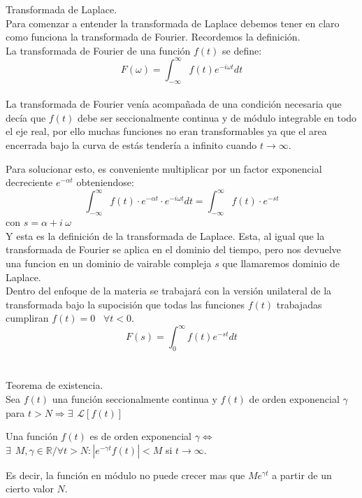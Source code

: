 \documentclass[]{article}
\begin{document}
\huge Transformada de Laplace.
\\

\normalsize Para comenzar a entender la transformada de Laplace debemos tener en claro como funciona la transformada de Fourier. Recordemos la definición.
\\
La transformada de Fourier de una función $f(t)$ se define:
$$
F(\omega) = \int_{-\infty}^{\infty}f(t)e^{-i\omega t} dt 
$$
\\
La transformada de Fourier venía acompañada de una condición necesaria que decía que $f(t)$ debe ser seccionalmente continua y de módulo integrable en todo el eje real, por ello muchas funciones no eran transformables ya que el area encerrada bajo la curva de estás tendería a infinito cuando $t\rightarrow \infty$.

Para solucionar esto, es conveniente multiplicar por un factor exponencial decreciente $e^{-\alpha t }$ obteniendose:
$$
\int_{-\infty}^{\infty} f(t) \cdot  e^{-\alpha t}\cdot  e^{-i\omega t}dt =
\int_{-\infty}^{\infty} f(t) \cdot  e^{-st}
$$
con $s=\alpha + i \hspace{3pt} \omega $
\\ Y esta es la definición de la transformada de Laplace. Esta, al igual que la transformada de Fourier se aplica en el dominio del tiempo, pero nos devuelve una funcion en un dominio de vairable compleja $s$ que llamaremos dominio de Laplace.
\\ Dentro del enfoque de la materia se trabajará con la versión unilateral de la transformada bajo la supocisión que todas las funciones $f(t)$ trabajadas cumpliran 
$f(t) = 0  \hspace{10pt} \forall t < 0$.
$$
F(s) = \int_{0}^{\infty} f(t) e^{-st} dt
$$
\\
\\
\Large Teorema de existencia.
\\

\normalsize Sea $f(t)$ una función seccionalmente continua y $f(t)$ de orden exponencial $\gamma$ para $t > N \Rightarrow \exists \hspace{5pt} \mathscr{L}[f(t)]$

Una función $f(t)$ es de orden exponencial $\gamma \Longleftrightarrow$ ${\exists \hspace{5pt} M,\gamma \in \mathbb{R}  / \forall t > N: |e^{-\gamma t} f(t)| < M }$ si $t \rightarrow \infty$.

Es decir, la función en módulo no puede crecer mas que $Me^{\gamma t}$ a partir de un cierto valor $N$.
\end{document}
